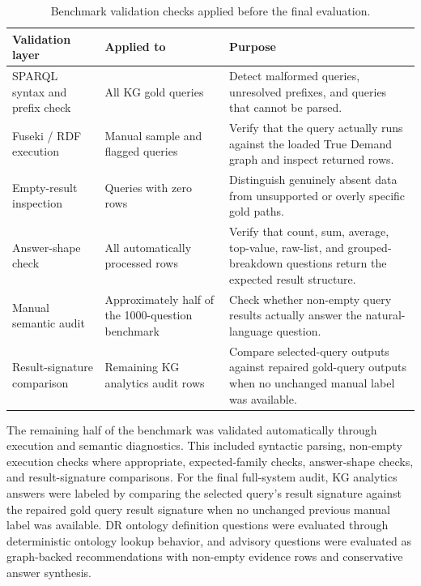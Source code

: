 \documentclass[
  12pt,
  english,
  oneside]{report}
\begin{document}
\begin{table}[htbp]
\centering
\caption{Benchmark validation checks applied before the final evaluation.}
\label{tab:benchmark-validation-checks}
\small
\begin{tabularx}{\textwidth}{
>{\raggedright\arraybackslash}p{3.2cm}
>{\raggedright\arraybackslash}p{3.1cm}
>{\raggedright\arraybackslash}X
}
\toprule
\textbf{Validation layer} & \textbf{Applied to} & \textbf{Purpose} \\
\midrule
SPARQL syntax and prefix check & All KG gold queries & Detect malformed queries, unresolved prefixes, and queries that cannot be parsed. \\
Fuseki / RDF execution & Manual sample and flagged queries & Verify that the query actually runs against the loaded True Demand graph and inspect returned rows. \\
Empty-result inspection & Queries with zero rows & Distinguish genuinely absent data from unsupported or overly specific gold paths. \\
Answer-shape check & All automatically processed rows & Verify that count, sum, average, top-value, raw-list, and grouped-breakdown questions return the expected result structure. \\
Manual semantic audit & Approximately half of the 1000-question benchmark & Check whether non-empty query results actually answer the natural-language question. \\
Result-signature comparison & Remaining KG analytics audit rows & Compare selected-query outputs against repaired gold-query outputs when no unchanged manual label was available. \\
\bottomrule
\end{tabularx}
\end{table}

The remaining half of the benchmark was validated automatically through execution and semantic diagnostics. This included syntactic parsing, non-empty execution checks where appropriate, expected-family checks, answer-shape checks, and result-signature comparisons. For the final full-system audit, KG analytics answers were labeled by comparing the selected query's result signature against the repaired gold query result signature when no unchanged previous manual label was available. DR ontology definition questions were evaluated through deterministic ontology lookup behavior, and advisory questions were evaluated as graph-backed recommendations with non-empty evidence rows and conservative answer synthesis.
\end{document}

